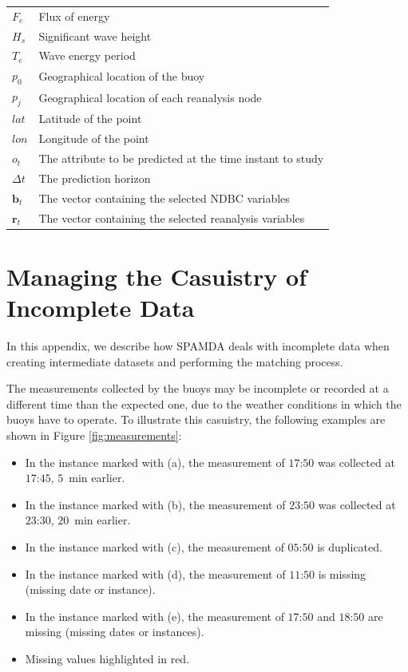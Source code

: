 \documentclass[energies,article,accept,moreauthors,pdftex]{Definitions/mdpi}
\begin{document}
\begin{paracol}{2}
{\noindent 
\begin{tabular}{@{}ll}
$F_e$ & Flux of energy\\
$H_s$ & Significant wave height\\
$T_e$ & Wave energy period\\
$p_0$ & Geographical location of the buoy\\
$p_j$ & Geographical location of each reanalysis node\\
$lat$ & Latitude of the point\\
$lon$ & Longitude of the point\\
$o_{t}$ & The attribute to be predicted at the time instant to study\\
$\Delta t$ & The prediction horizon\\
$\mathbf{b}_t$ & The vector containing the selected NDBC variables\\
$\mathbf{r}_{t}$ & The vector containing the selected reanalysis variables\\
\end{tabular}}

\appendixstart
\appendix
\section{Managing the Casuistry of Incomplete Data}\label{app:AppendixA}

		In this appendix, we describe how SPAMDA deals with incomplete data when creating intermediate datasets and performing the matching process.
		
		The measurements collected by the buoys may be incomplete or recorded at a different time than the expected one, due to the weather conditions in which the buoys have to operate. To illustrate this casuistry, the following examples are shown in Figure \ref{fig:measurements}:		
		\begin{itemize}
			\item In the instance marked with (a), the measurement of $17$:$50$ was collected at $17$:$45$, \mbox{$5$ min} earlier.
			\item In the instance marked with (b), the measurement of $23$:$50$ was collected at $23$:$30$, \mbox{$20$ min} earlier.
			\item In the instance marked with (c), the measurement of $05$:$50$ is duplicated.
			\item In the instance marked with (d), the measurement of $11$:$50$ is missing (missing date or instance).
			\item In the instance marked with (e), the measurement of $17$:$50$ and $18$:$50$ are missing (missing dates or instances).
			\item Missing values highlighted in red.
		\end{itemize}
		


\end{paracol}
\end{document}
